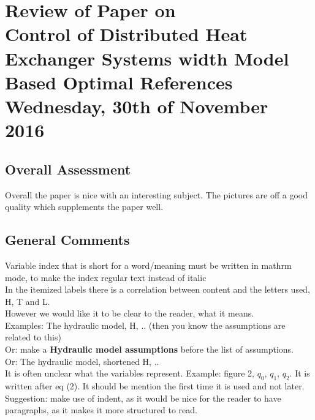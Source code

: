 
\renewcommand{\vec}[1]{\boldsymbol{\mathbf{#1}}}

\renewcommand\chaptername{KAPITEL}
\renewcommand\contentsname{Indhold}
\renewcommand\figurename{Figur}
\renewcommand\tablename{Tabel}

\section*{Review of Paper on\\
Control of Distributed Heat Exchanger Systems width
Model Based Optimal References\\
\small Wednesday, 30th of November 2016}
\subsection{Overall Assessment}
Overall the paper is nice with an interesting subject. The pictures are off a good quality which supplements the paper well. 

\subsection{General Comments}

\noindent Variable index that is short for a word/meaning must be written in mathrm mode, to make the index regular text instead of italic \\
 
\noindent In the itemized labels there is a correlation between content and the letters used, H, T and L. \\
However we would like it to be clear to the reader, what it means. \\
Examples: The hydraulic model, H, .. (then you know the assumptions are related to this) \\
Or: make a \textbf{Hydraulic model assumptions} before the list of assumptions. \\
Or: The hydraulic model, shortened H, .. \\

\noindent It is often unclear what the variables represent. Example: figure 2, $q_0$, $q_1$, $q_2$.  It is written after eq (2). It should be mention the first time it is used and not later.\\
Suggestion: make use of indent, as it would be nice for the reader to have paragraphs, as it makes it more structured to read. \\
 
